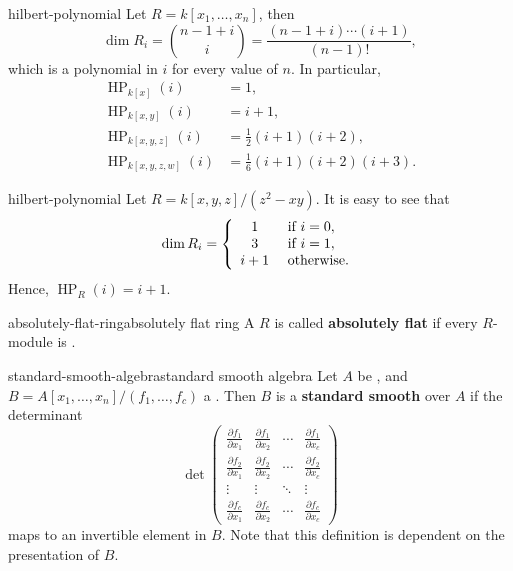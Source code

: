 \begin{example}{hilbert-polynomial}
    Let $R = k[x_1, \ldots, x_n]$, then
    \[ \dim R_i = \binom{n - 1 + i}{i} = \frac{(n - 1 + i) \cdots (i + 1)}{(n - 1)!} , \]
    which is a polynomial in $i$ for every value of $n$. In particular,
    \[ \begin{aligned}
        \operatorname{HP}_{k[x]}(i) &= 1, \\
        \operatorname{HP}_{k[x, y]}(i) &= i + 1, \\
        \operatorname{HP}_{k[x, y, z]}(i) &= \tfrac{1}{2} (i + 1)(i + 2), \\
        \operatorname{HP}_{k[x, y, z, w]}(i) &= \tfrac{1}{6} (i + 1)(i + 2)(i + 3) .
    \end{aligned} \]
\end{example}

\begin{example}{hilbert-polynomial}
    Let $R = k[x, y, z] / (z^2 - xy)$. It is easy to see that
    \[ \dim R_i = \left\{ \begin{array}{cl}
        1 & \textup{ if } i = 0, \\
        3 & \textup{ if } i = 1, \\
        i + 1 & \textup{ otherwise}.
    \end{array} \right. \]
    Hence, $\operatorname{HP}_R(i) = i + 1$.
\end{example}

\begin{topic}{absolutely-flat-ring}{absolutely flat ring}
    A  $R$ is called \textbf{absolutely flat} if every $R$-module is .
\end{topic}

\begin{topic}{standard-smooth-algebra}{standard smooth algebra}
    Let $A$ be , and $B = A[x_1, \ldots, x_n] / (f_1, \ldots, f_c)$ a . Then $B$ is a \textbf{standard smooth} over $A$ if the determinant
    \[ \det \begin{pmatrix}
        \frac{\partial f_1}{\partial x_1} & \frac{\partial f_1}{\partial x_2} & \cdots & \frac{\partial f_1}{\partial x_c} \\
        \frac{\partial f_2}{\partial x_1} & \frac{\partial f_2}{\partial x_2} & \cdots & \frac{\partial f_2}{\partial x_c} \\ 
        \vdots & \vdots & \ddots & \vdots \\ 
        \frac{\partial f_c}{\partial x_1} & \frac{\partial f_c}{\partial x_2} & \cdots & \frac{\partial f_c}{\partial x_c}
    \end{pmatrix} \]
    maps to an invertible element in $B$. Note that this definition is dependent on the presentation of $B$.
\end{topic}

